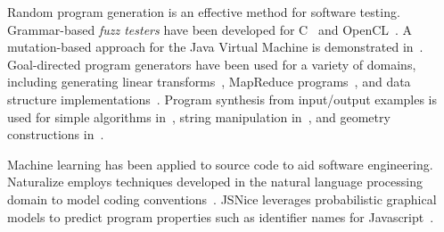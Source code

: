 Random program generation is an effective method for software testing. Grammar-based \emph{fuzz testers} have been developed for C~\cite{Yang2012} and OpenCL~\cite{Lidbury2015a}. A mutation-based approach for the Java Virtual Machine is demonstrated in~\cite{Chena}. Goal-directed program generators have been used for a variety of domains, including generating linear transforms~\cite{Voronenko2009}, MapReduce programs~\cite{Smith}, and data structure implementations~\cite{Loncaric2016}. Program synthesis from input/output examples is used for simple algorithms in~\cite{Zaremba2015a}, string manipulation in~\cite{Gulwani2011}, and geometry constructions in~\cite{Gulwani2012}.

Machine learning has been applied to source code to aid software engineering. Naturalize employs techniques developed in the natural language processing domain to model coding conventions~\cite{Allamanis2014a}. JSNice leverages probabilistic graphical models to predict program properties such as identifier names for Javascript~\cite{Raychev}.


